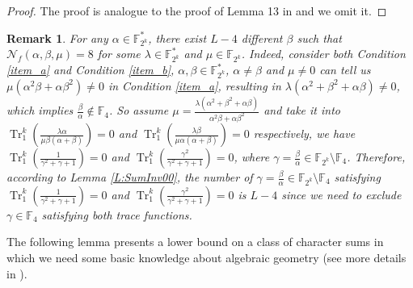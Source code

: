 \documentclass{article}
\newcommand{\F}{\mathbb{F}}
\newcommand{\0}{\textbf{0}}
\newcommand{\1}{\textbf{1}}
\newcommand{\TRACE}{\operatorname{Tr}_1^k}
\theoremstyle{plain}
\newtheorem{remark}{Remark}
\begin{document}
    \begin{proof}
        The proof is analogue to the proof of Lemma 13 in \cite{TangMM2022inversefunction} and we omit it.
    \end{proof}
    \begin{remark}
        For any $\alpha\in\F_{2^k}^*$, there exist $L-4$ different $\beta$
        such that $\mathcal{N}_f(\alpha,\beta,\mu)=8$ for some $\lambda\in\F_{2^k}^*$ and $\mu\in\F_{2^k}$.
        Indeed, consider both Condition \ref{item_a} and Condition \ref{item_b}, $\alpha,\beta\in\F_{2^k}^*$, $\alpha\ne\beta$ and $\mu\ne 0$
        can tell us $\mu(\alpha^2\beta+\alpha\beta^2)\ne 0$ in Condition \ref{item_a},
        resulting in $\lambda(\alpha^2+\beta^2+\alpha\beta)\ne 0$,
        which implies $\frac{\beta}{\alpha}\notin\F_4$.
        So assume $\mu=\frac{\lambda(\alpha^2+\beta^2+\alpha\beta)}{\alpha^2\beta+\alpha\beta^2}$ and take it
        into $\TRACE\left(\frac{\lambda \alpha}{\mu \beta(\alpha+\beta)}\right)=0$
        and $\TRACE\left(\frac{\lambda \beta}{\mu \alpha(\alpha+\beta)}\right)=0$ respectively,
        we have $\TRACE\left(\frac{1}{\gamma^2+\gamma+1}\right)=0$ and $\TRACE\left(\frac{\gamma^2}{\gamma^2+\gamma+1}\right)=0$,
        where $\gamma=\frac{\beta}{\alpha}\in\F_{2^k}\setminus\F_{4}$.
        Therefore, according to Lemma \ref{L:SumInv00},
        the number of $\gamma=\frac{\beta}{\alpha}\in\F_{2^k}\setminus\F_{4}$ satisfying
        $\TRACE\left(\frac{1}{\gamma^2+\gamma+1}\right)=0$ and $\TRACE\left(\frac{\gamma^2}{\gamma^2+\gamma+1}\right)=0$
        is $L-4$ since we need to exclude $\gamma\in\F_4$ satisfying both trace functions.
    \end{remark}


The following lemma presents a lower bound on a class of character sums in which we need some basic knowledge
about  algebraic geometry (see more details in \cite{Stichtenoth2008book_algebraicfunctionfieldsandcodes}).
\end{document}
